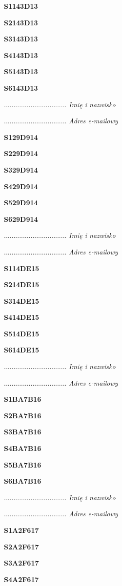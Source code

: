 \Large \textbf{S1143D13}

\Large \textbf{S2143D13}

\Large \textbf{S3143D13}

\Large \textbf{S4143D13}

\Large \textbf{S5143D13}

\Large \textbf{S6143D13}

.................................
\textit{Imię i nazwisko}

.................................
\textit{Adres e-mailowy}

\Large \textbf{S129D914}

\Large \textbf{S229D914}

\Large \textbf{S329D914}

\Large \textbf{S429D914}

\Large \textbf{S529D914}

\Large \textbf{S629D914}

.................................
\textit{Imię i nazwisko}

.................................
\textit{Adres e-mailowy}

\Large \textbf{S114DE15}

\Large \textbf{S214DE15}

\Large \textbf{S314DE15}

\Large \textbf{S414DE15}

\Large \textbf{S514DE15}

\Large \textbf{S614DE15}

.................................
\textit{Imię i nazwisko}

.................................
\textit{Adres e-mailowy}

\Large \textbf{S1BA7B16}

\Large \textbf{S2BA7B16}

\Large \textbf{S3BA7B16}

\Large \textbf{S4BA7B16}

\Large \textbf{S5BA7B16}

\Large \textbf{S6BA7B16}

.................................
\textit{Imię i nazwisko}

.................................
\textit{Adres e-mailowy}

\Large \textbf{S1A2F617}

\Large \textbf{S2A2F617}

\Large \textbf{S3A2F617}

\Large \textbf{S4A2F617}

